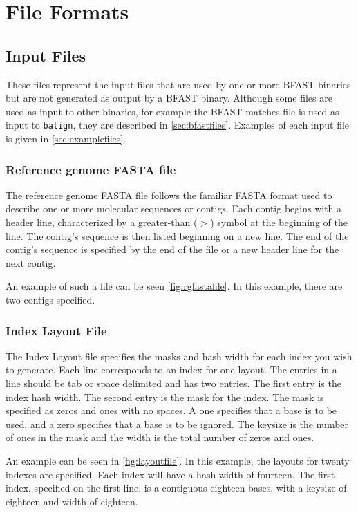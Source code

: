\documentclass[a4paper,12pt]{book}
\newcommand{\TT}[1]{{\tt #1}} %
\newcommand{\rGFF}{reference genome FASTA file}
\newcommand{\RGFF}{Reference genome FASTA file}
\newcommand{\BMF}{BFAST matches file} %
\begin{document}
\chapter{File Formats}
\section{Input Files}
\label{sec:inputfiles}
These files represent the input files that are used by one or more BFAST binaries but are not generated as output by a BFAST binary.
Although some files are used as input to other binaries, for example the \BMF{} is used as input to \TT{balign}, they are described in \autoref{sec:bfastfiles}.
Examples of each input file is given in \autoref{sec:examplefiles}.
\subsection{\RGFF{}}
\label{sec:rgfastafile}
The \rGFF{} follows the familiar FASTA format used to describe one or more molecular sequences or contigs.
Each contig begins with a header line, characterized by a greater-than ($>$) symbol at the beginning of the line.
The contig's sequence is then listed beginning on a new line.
The end of the contig's sequence is specified by the end of the file or a new header line for the next contig.

An example of such a file can be seen \autoref{fig:rgfastafile}.
In this example, there are two contigs specified. 

\subsection{Index Layout File}
\label{sec:layoutfile}
The Index Layout file specifies the masks and hash width for each index you wish to generate.
Each line corresponds to an index for one layout.
The entries in a line should be tab or space delimited and has two entries.
The first entry is the index hash width.
The second entry is the mask for the index.
The mask is specified as zeros and ones with no spaces.
A one specifies that a base is to be used, and a zero specifies that a base is to be ignored.
The keysize is the number of ones in the mask and the width is the total number of zeros and ones.

An example can be seen in \autoref{fig:layoutfile}.
In this example, the layouts for twenty indexes are specified.
Each index will have a hash width of fourteen.
The first index, specified on the first line, is a contiguous eighteen bases, with a keysize of eighteen and width of eighteen.
\end{document}
